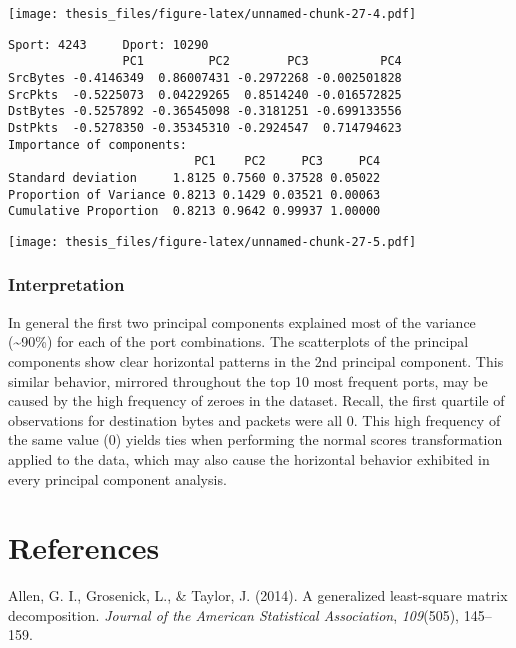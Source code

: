 \documentclass[12pt,twoside]{dukestatscithesis}
\theoremstyle{definition}
\theoremstyle{definition}
\theoremstyle{definition}
\theoremstyle{remark}
\begin{document}
\texttt{[image: thesis\_files/figure-latex/unnamed-chunk-27-4.pdf]}
\begin{verbatim}
Sport: 4243     Dport: 10290 
                PC1         PC2        PC3          PC4
SrcBytes -0.4146349  0.86007431 -0.2972268 -0.002501828
SrcPkts  -0.5225073  0.04229265  0.8514240 -0.016572825
DstBytes -0.5257892 -0.36545098 -0.3181251 -0.699133556
DstPkts  -0.5278350 -0.35345310 -0.2924547  0.714794623
Importance of components:
                          PC1    PC2     PC3     PC4
Standard deviation     1.8125 0.7560 0.37528 0.05022
Proportion of Variance 0.8213 0.1429 0.03521 0.00063
Cumulative Proportion  0.8213 0.9642 0.99937 1.00000
\end{verbatim}
\texttt{[image: thesis\_files/figure-latex/unnamed-chunk-27-5.pdf]}

\subsection{Interpretation}\label{interpretation}

In general the first two principal components explained most of the
variance (\textasciitilde{}90\%) for each of the port combinations. The
scatterplots of the principal components show clear horizontal patterns
in the 2nd principal component. This similar behavior, mirrored
throughout the top 10 most frequent ports, may be caused by the high
frequency of zeroes in the dataset. Recall, the first quartile of
observations for destination bytes and packets were all 0. This high
frequency of the same value (0) yields ties when performing the normal
scores transformation applied to the data, which may also cause the
horizontal behavior exhibited in every principal component analysis.

\backmatter

\chapter*{References}\label{references}


\noindent

\setlength{\parindent}{-0.20in} \setlength{\leftskip}{0.20in}
\setlength{\parskip}{8pt}

\hypertarget{refs}{}
\hypertarget{ref-GLSmatrix2013}{}
Allen, G. I., Grosenick, L., \& Taylor, J. (2014). A generalized
least-square matrix decomposition. \emph{Journal of the American
Statistical Association}, \emph{109}(505), 145--159.
\end{document}
